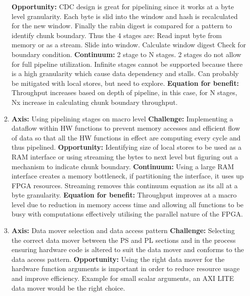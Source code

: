 \documentclass{article}
\begin{document}
\begin{enumerate}
\newline
\textbf{Opportunity:} CDC design is great for pipelining since it works at a byte level granularity. Each byte is slid into the window and hash is recalculated for the new window. Finally the rabin digest is compared for a pattern to identify chunk boundary.
Thus the 4 stages are:
Read input byte from memory or as a stream.
Slide into window.
Calculate window digest
Check for boundary condition.
\newline
\textbf{Continuum:} 2 stage to N stages. 2 stages do not allow for full pipeline utilization. Infinite stages cannot be supported because there is a high granularity which cause data dependency and stalls. Can probably be mitigated with local stores, but need to explore.
\newline
\textbf{Equation for benefit:} Throughput increases based on depth of pipeline, in this case, for N stages, Nx increase in calculating chunk boundary throughput.
\item%
\textbf{Axis:} Using pipelining stages on macro level
\newline
\textbf{Challenge:} Implementing a dataflow within HW functions to prevent memory accesses and efficient flow of data so that all the HW functions in effect are computing every cycle and thus pipelined.
\newline
\textbf{Opportunity:} Identifying size of local stores to be used as a RAM interface or using streaming the bytes to next level but figuring out a mechanism to indicate chunk boundary. 
\newline
\textbf{Continuum:} Using a large RAM interface creates a memory bottleneck, if partitioning the interface, it uses up FPGA resources.
Streaming removes this continuum equation as its all at a byte granularity.
\newline
\textbf{Equation for benefit: } Throughput improves at a macro level due to reduction in memory access time and allowing all functions to be busy with computations effectively utilising the parallel nature of the FPGA.
\item%
\textbf{Axis:} Data mover selection and data access pattern
\newline
\textbf{Challenge:} Selecting the correct data mover between the PS and PL sections and in the process ensuring hardware code is altered to suit the data mover and conforms to the data access pattern. 
\newline
\textbf{Opportunity:} Using the right data mover for the hardware function arguments is important in order to reduce resource usage and improve efficiency. Example for small scalar arguments, an AXI LITE data mover would be the right choice.

\end{enumerate}
\end{document}
